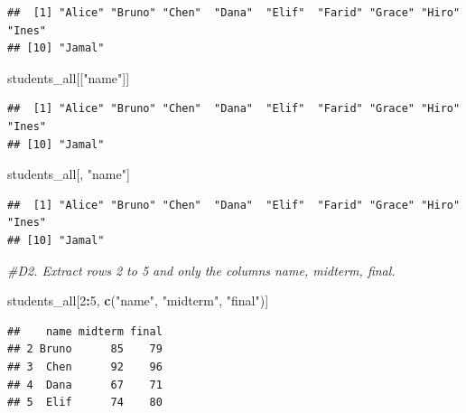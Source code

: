 \documentclass[
]{article}
\newenvironment{Shaded}{\begin{snugshade}}{\end{snugshade}}
\newcommand{\CommentTok}[1]{\textcolor[rgb]{0.56,0.35,0.01}{\textit{#1}}}
\newcommand{\DecValTok}[1]{\textcolor[rgb]{0.00,0.00,0.81}{#1}}
\newcommand{\FunctionTok}[1]{\textcolor[rgb]{0.13,0.29,0.53}{\textbf{#1}}}
\newcommand{\NormalTok}[1]{#1}
\newcommand{\SpecialCharTok}[1]{\textcolor[rgb]{0.81,0.36,0.00}{\textbf{#1}}}
\newcommand{\StringTok}[1]{\textcolor[rgb]{0.31,0.60,0.02}{#1}}
\begin{document}
\begin{verbatim}
##  [1] "Alice" "Bruno" "Chen"  "Dana"  "Elif"  "Farid" "Grace" "Hiro"  "Ines" 
## [10] "Jamal"
\end{verbatim}

\begin{Shaded}
\begin{Highlighting}[]
\NormalTok{students\_all[[}\StringTok{"name"}\NormalTok{]]}
\end{Highlighting}
\end{Shaded}

\begin{verbatim}
##  [1] "Alice" "Bruno" "Chen"  "Dana"  "Elif"  "Farid" "Grace" "Hiro"  "Ines" 
## [10] "Jamal"
\end{verbatim}

\begin{Shaded}
\begin{Highlighting}[]
\NormalTok{students\_all[, }\StringTok{"name"}\NormalTok{]}
\end{Highlighting}
\end{Shaded}

\begin{verbatim}
##  [1] "Alice" "Bruno" "Chen"  "Dana"  "Elif"  "Farid" "Grace" "Hiro"  "Ines" 
## [10] "Jamal"
\end{verbatim}

\begin{Shaded}
\begin{Highlighting}[]
\CommentTok{\#D2. Extract rows 2 to 5 and only the columns name, midterm, final.}

\NormalTok{students\_all[}\DecValTok{2}\SpecialCharTok{:}\DecValTok{5}\NormalTok{, }\FunctionTok{c}\NormalTok{(}\StringTok{"name"}\NormalTok{, }\StringTok{"midterm"}\NormalTok{, }\StringTok{"final"}\NormalTok{)]}
\end{Highlighting}
\end{Shaded}

\begin{verbatim}
##    name midterm final
## 2 Bruno      85    79
## 3  Chen      92    96
## 4  Dana      67    71
## 5  Elif      74    80
\end{verbatim}

\begin{Shaded}
\end{Shaded}
\end{document}
